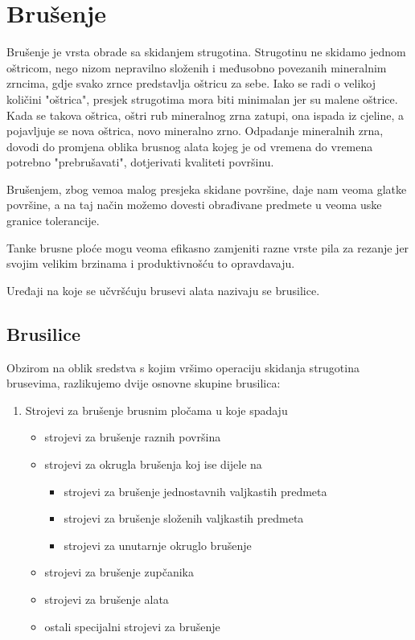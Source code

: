 \documentclass[a4paper,12pt]{article}
\numberwithin{figure}{section}
\begin{document}
\section{Brušenje}
Brušenje je vrsta obrade sa skidanjem strugotina. Strugotinu ne skidamo jednom oštricom, nego nizom nepravilno složenih i međusobno povezanih mineralnim zrncima, gdje svako zrnce predstavlja oštricu za sebe. Iako se radi o velikoj količini "oštrica", presjek strugotima mora biti minimalan jer su malene oštrice. Kada se takova oštrica, oštri rub mineralnog zrna zatupi, ona ispada iz cjeline, a pojavljuje se nova oštrica, novo mineralno zrno. Odpadanje mineralnih zrna, dovodi do promjena oblika brusnog alata kojeg je od vremena do vremena potrebno "prebrušavati", dotjerivati kvaliteti površinu.\par 
Brušenjem, zbog vemoa malog presjeka skidane površine, daje nam veoma glatke površine, a na taj način možemo dovesti obrađivane predmete u veoma uske granice tolerancije. \par
Tanke brusne ploće mogu veoma efikasno zamjeniti razne vrste pila za rezanje jer svojim velikim brzinama i produktivnošću to opravdavaju. \par
Uređaji na koje se učvršćuju brusevi alata nazivaju se brusilice.
\subsection{Brusilice}
Obzirom na oblik sredstva s kojim vršimo operaciju skidanja strugotina brusevima, razlikujemo dvije osnovne skupine brusilica:
\begin{enumerate}
\item Strojevi za brušenje brusnim pločama u koje spadaju
\begin{itemize}
\item strojevi za brušenje raznih površina
\item strojevi za okrugla brušenja koj ise dijele na 
\begin{itemize}
\item strojevi za brušenje jednostavnih valjkastih predmeta
\item strojevi za brušenje složenih valjkastih predmeta
\item strojevi za unutarnje okruglo brušenje
\end{itemize}
\item strojevi za brušenje zupčanika
\item strojevi za brušenje alata
\item ostali specijalni strojevi za brušenje
\end{itemize}
\end{enumerate}
\end{document}
